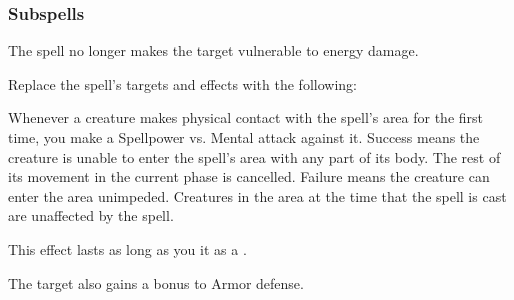 \subsubsection{Subspells}



The spell no longer makes the target vulnerable to energy damage.









Replace the spell's targets and effects with the following:
\begin{spellcontent}

\begin{augmenttargetinginfo}



\end{augmenttargetinginfo}


\begin{augmenteffects}



\spelleffect
Whenever a creature makes physical contact with the spell's area for the first time, you make a Spellpower vs. Mental attack against it.
Success means the creature is unable to enter the spell's area with any part of its body.
The rest of its movement in the current phase is cancelled.
Failure means the creature can enter the area unimpeded.
Creatures in the area at the time that the spell is cast are unaffected by the spell.

This effect lasts as long as you  it as a .






\end{augmenteffects}

\end{spellcontent}






The target also gains a  bonus to Armor defense.









